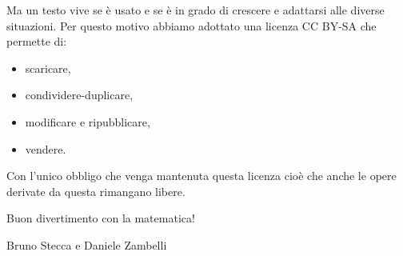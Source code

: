 Ma un testo vive se è usato e se è in grado di crescere e adattarsi alle 
diverse situazioni. Per questo motivo abbiamo adottato una licenza CC BY-SA che 
permette di:
\begin{itemize} [nosep]
\item scaricare,
\item condividere-duplicare,
\item modificare e ripubblicare,
\item vendere.
\end{itemize}

Con l'unico obbligo che venga mantenuta questa licenza cioè che anche le 
opere derivate da questa rimangano libere.


Buon divertimento con la matematica!

\begin{flushright}
Bruno Stecca e Daniele Zambelli
\end{flushright}


